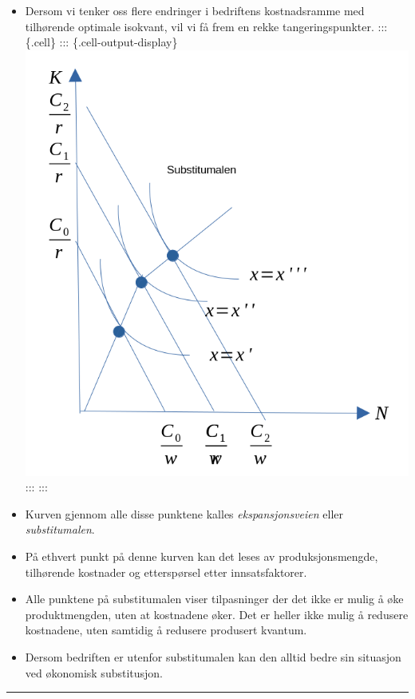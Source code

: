 \documentclass[
  letterpaper,
  DIV=11,
  numbers=noendperiod]{scrartcl}
\begin{document}
\begin{itemize}
\item
  Dersom vi tenker oss flere endringer i bedriftens kostnadsramme med
  tilhørende optimale isokvant, vil vi få frem en rekke
  tangeringspunkter. ::: \{.cell\} ::: \{.cell-output-display\}
  \includegraphics[width=1\textwidth,height=\textheight]{drawio/submalen.png}
  ::: :::
\item
  Kurven gjennom alle disse punktene kalles \emph{ekspansjonsveien}
  eller \emph{substitumalen}.
\item
  På ethvert punkt på denne kurven kan det leses av produksjonsmengde,
  tilhørende kostnader og etterspørsel etter innsatsfaktorer.
\item
  Alle punktene på substitumalen viser tilpasninger der det ikke er
  mulig å øke produktmengden, uten at kostnadene øker. Det er heller
  ikke mulig å redusere kostnadene, uten samtidig å redusere produsert
  kvantum.
\item
  Dersom bedriften er utenfor substitumalen kan den alltid bedre sin
  situasjon ved økonomisk substitusjon.
\end{itemize}

\begin{center}\rule{0.5\linewidth}{0.5pt}\end{center}
\end{document}
